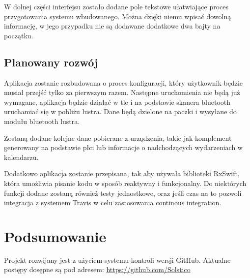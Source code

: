 \documentclass[a4paper,11pt]{article}
\begin{document}
W dolnej części interfejsu zostało dodane pole tekstowe ułatwiające proces przygotowania systemu wbudowanego. Można dzięki niemu wpisać dowolną informację, w jego przypadku nie są dodawane dodatkowe dwa bajty na początku.

\subsection{Planowany rozwój}

Aplikacja zostanie rozbudowana o proces konfiguracji, który użytkownik będzie musiał przejść tylko za pierwszym razem. Następne uruchomienia nie będą już wymagane, aplikacja będzie działać w tle i na podstawie skanera bluetooth uruchamiać się w pobliżu lustra. Dane będą dzielone na paczki i wysyłane do modułu bluetooth lustra.

Zostaną dodane kolejne dane pobierane z urządzenia, takie jak komplement generowany na podstawie płci lub informacje o nadchodzących wydarzeniach w kalendarzu.

Dodatkowo aplikacja zostanie przepisana, tak aby używała biblioteki RxSwift, która umożliwia pisanie kodu w sposób reaktywny i funkcjonalny. Do niektórych funkcji dodane zostaną również testy jednostkowe, oraz jeśli czas na to pozwoli integracja z systemem Travis w celu zastosowania continous integration.
	
	
\section{Podsumowanie}
	Projekt rozwijany jest z użyciem systemu kontroli wersji GitHub. Aktualne postępy dosępne są pod adresem: \url{https://github.com/Solstico}
	
	
	
	
	
	
\end{document}
